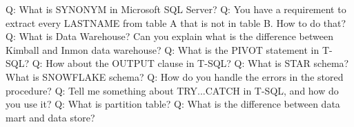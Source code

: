 \documentclass[a4paper,11pt]{article}
\begin{document}
\noindent 
Q: What is SYNONYM in Microsoft SQL Server? \newline \newline
\noindent 
Q: You have a requirement to extract every LASTNAME from table A that is not in table B. How to do that? \newline \newline
\noindent 
Q: What is Data Warehouse? Can you explain what is the difference between Kimball and Inmon data warehouse? \newline \newline
\noindent 
Q: What is the PIVOT statement in T-SQL? \newline \newline
\noindent 
Q: How about the OUTPUT clause in T-SQL? \newline \newline
\noindent 
Q: What is STAR schema? What is SNOWFLAKE schema? \newline \newline
\noindent 
Q: How do you handle the errors in the stored procedure? \newline \newline
\noindent 
Q: Tell me something about TRY...CATCH in T-SQL, and how do you use it? \newline \newline
\noindent 
Q: What is partition table? \newline \newline
\noindent 
Q: What is the difference between data mart and data store? \newline \newline
\end{document}
